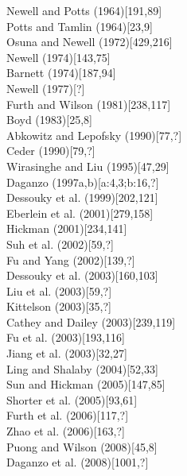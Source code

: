 \documentclass{article}
\begin{document}
\noindent \textrm{Newell and Potts (1964)}[191,89]\\
\noindent \textrm{Potts and Tamlin (1964)}[23,9]\\
\noindent \textrm{Osuna and Newell (1972)}[429,216]\\
\noindent \textrm{Newell (1974)}[143,75]\\
\noindent \textrm{Barnett (1974)}[187,94]\\
\noindent \textrm{Newell (1977)}[?]\\
\noindent \textrm{Furth and Wilson (1981)}[238,117]\\
\noindent \textrm{Boyd (1983)}[25,8]\\
\noindent \textrm{Abkowitz and Lepofsky (1990)}[77,?]\\
\noindent \textrm{Ceder (1990)}[79,?]\\
\noindent \textrm{Wirasinghe and Liu (1995)}[47,29]\\
\noindent \textrm{Daganzo (1997a,b)}[a:4,3;b:16,?]\\
\noindent \textrm{Dessouky et al. (1999)}[202,121]\\
\noindent \textrm{Eberlein et al. (2001)}[279,158]\\
\noindent \textrm{Hickman (2001)}[234,141]\\
\noindent \textrm{Suh et al. (2002)}[59,?]\\
\noindent \textrm{Fu and Yang (2002)}[139,?]\\
\noindent \textrm{Dessouky et al. (2003)}[160,103]\\
\noindent \textrm{Liu et al. (2003)}[59,?]\\ 
\noindent \textrm{Kittelson (2003)}[35,?]\\
\noindent \textrm{Cathey and Dailey (2003)}[239,119]\\
\noindent \textrm{Fu et al. (2003)}[193,116]\\
\noindent \textrm{Jiang et al. (2003)}[32,27]\\
\noindent \textrm{Ling and Shalaby (2004)}[52,33]\\
\noindent \textrm{Sun and Hickman (2005)}[147,85]\\
\noindent \textrm{Shorter et al. (2005)}[93,61]\\
\noindent \textrm{Furth et al. (2006)}[117,?]\\
\noindent \textrm{Zhao et al. (2006)}[163,?]\\
\noindent \textrm{Puong and Wilson (2008)}[45,8]\\
\noindent \textrm{Daganzo et al. (2008)}[1001,?]\\
\end{document}
